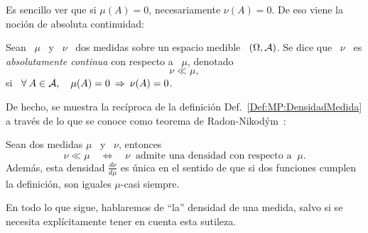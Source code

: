 Es sencillo ver que  si $\mu(A) = 0$, necesariamente $\nu(A) =  0$. De eso viene
la noci\'on de absoluta continuidad:
%
\begin{definicion}
  Sean  \  $\mu$  \  y  \  $\nu$  \ dos  medidas  sobre  un  espacio  medible  \
  $(\Omega,\mathcal{A})$.   Se dice que  \ $\nu$  \ es  {\it absolutamente  continua} con
  respecto a \ $\mu$, denotado \[\nu \ll \mu,\] si \ $\forall \: A \in \mathcal{A}, \quad
  \mu(A) = 0 \: \Rightarrow \: \nu(A) = 0$.
\end{definicion}
%
De    hecho,     se    muestra    la    rec\'iproca     de    la    definici\'on
Def.~\ref{Def:MP:DensidadMedida} a trav\'es de lo  que se conoce como teorema de
Radon-Nikod\'ym~\cite{Nik30, AthLah06, Bog07:v1, Coh13}:
%
\begin{teorema}\label{Th:MP:RadonNikodym}
  Sean dos medidas $\mu$ \ y \ $\nu$, entonces
  \[
  \nu \ll \mu \quad \Longleftrightarrow  \quad \nu \: \mbox{ admite una densidad
    con respecto a } \: \mu.
  \]
  Adem\'as, esta densidad $\frac{d\nu}{d\mu}$ es \'unica en el sentido de que si
  dos funciones cumplen la definici\'on, son iguales $\mu$-casi siempre.
\end{teorema}

En todo lo que  sigue, hablaremos de ``la'' densidad de una  medida, salvo si se
necesita expl\'icitamente tener en cuenta esta sutileza.

